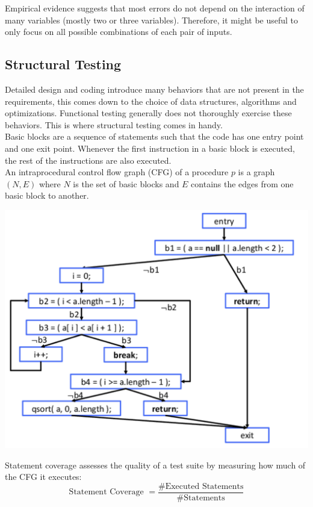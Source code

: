 Empirical evidence suggests that most errors do not depend on the interaction of many variables (mostly two or three variables). Therefore, it might be useful to only focus on all possible combinations of each pair of inputs.


\subsection{Structural Testing}

Detailed design and coding introduce many behaviors that are not present in the requirements, this comes down to the choice of data structures, algorithms and optimizations. Functional testing generally does not thoroughly exercise these behaviors. This is where structural testing comes in handy. \\

Basic blocks are a sequence of statements such that the code has one entry point and one exit point. Whenever the first instruction in a basic block is executed, the rest of the instructions are also executed. \\

An intraprocedural control flow graph (CFG) of a procedure $p$ is a graph $(N,E)$ where $N$ is the set of basic blocks and $E$ contains the edges from one basic block to another.

\begin{center}
	\includegraphics[width=0.8\columnwidth]{assets/cfg}
\end{center}

Statement coverage assesses the quality of a test suite by measuring how much of the CFG it executes:
$$\text{Statement Coverage } = \frac{\text{\#Executed Statements}}{\text{\#Statements}}$$

